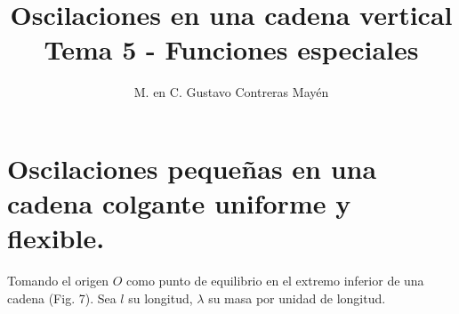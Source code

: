 
\title{Oscilaciones en una cadena vertical \\ \large {Tema 5 - Funciones especiales} \vspace{-3ex}}
\author{M. en C. Gustavo Contreras Mayén}
\date{ }

\vspace{-4cm}
\maketitle
\fontsize{14}{14}\selectfont
\tableofcontents
\newpage


\section{Oscilaciones pequeñas en una cadena colgante uniforme y flexible.}

Tomando el origen $O$ como punto de equilibrio en el extremo inferior de una cadena (Fig. 7). Sea $l$ su longitud, $\lambda$ su masa por unidad de longitud.




